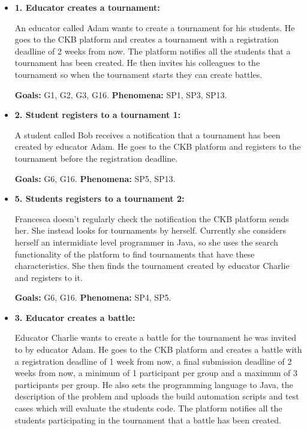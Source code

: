 \documentclass{article}
\begin{document}
\begin{itemize}
    \item \textbf{1. Educator creates a tournament:} 
    
    An educator called Adam wants to create a tournament for his students. He goes to the CKB platform and creates a tournament with a registration deadline of 2 weeks from now. The platform notifies all the students that a tournament has been created. He then invites his colleagues to the tournament so when the tournament starts they can create battles.

    \textbf{Goals:} G1, G2, G3, G16.
    \textbf{Phenomena:} SP1, SP3, SP13.

    \item \textbf{2. Student registers to a tournament 1:}
    
    A student called Bob receives a notification that a tournament has been created by educator Adam. He goes to the CKB platform and registers to the tournament before the registration deadline.

    \textbf{Goals:} G6, G16.
    \textbf{Phenomena:} SP5, SP13.

    \item \textbf{5. Students registers to a tournament 2:}
    
    Francesca doesn't regularly check the notification the CKB platform sends her. She instead looks for tournaments by herself. Currently she considers herself an intermidiate level programmer in Java, so she uses the search functionality of the platform to find tournaments that have these characteristics. She then finds the tournament created by educator Charlie and registers to it. 

    \textbf{Goals:} G6, G16.
    \textbf{Phenomena:} SP4, SP5.
    
    \item \textbf{3. Educator creates a battle:}
    
    Educator Charlie wants to create a battle for the tournament he was invited to by educator Adam. He goes to the CKB platform and creates a battle with a registration deadline of 1 week from now, a final submission deadline of 2 weeks from now, a minimum of 1 participant per group and a maximum of 3 participants per group. He also sets the programming language to Java, the description of the problem and uploads the build automation scripts and test cases which will evaluate the students code. The platform notifies all the students participating in the tournament that a battle has been created.


\end{itemize}
\end{document}

